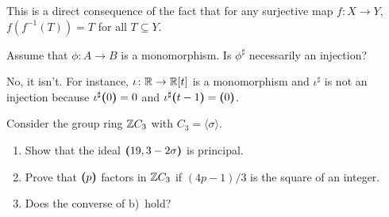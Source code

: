 \begin{solution}
    This is a direct consequence of the fact that for any surjective map $f\colon X\to Y$, $f(f^{-1}(T))=T$ for all $T\subseteq Y$.
\end{solution}

\begin{exr}
    Assume that\/ $\phi\colon A\to B$ is a monomorphism. Is\/ $\phi^\sharp$ necessarily an injection?
\end{exr}

\begin{solution}
    No, it isn't. For instance, $\iota\colon\mathbb{R}\to\mathbb{R}[t]$ is a monomorphism and $\iota^\sharp$ is not an injection because $\iota^\sharp\textrm{\boldmath$($}0\textrm{\boldmath$)$}=0$ and $\iota^\sharp\textrm{\boldmath$($}t-1\textrm{\boldmath$)$}=\textrm{\boldmath$($}0\textrm{\boldmath$)$}$.
\end{solution}

\begin{exr}
    Consider the group ring\/ $\mathbb{Z} C_3$ with\/ $C_3=\langle\sigma\rangle$.
    \begin{enumerate}[\rm a)]
        \item Show that the ideal\/ $\textrm{\boldmath$($}19,3-2 \sigma\textrm{\boldmath$)$}$ is principal.
        \item Prove that\/ $\textrm{\boldmath$($}p\textrm{\boldmath$)$}$ factors in\/ $\mathbb{Z} C_3$ if\/ $(4p-1)/3$ is the square of an integer.
        \item Does the converse of\/ {\rm b)}~hold?
    \end{enumerate}
\end{exr}

